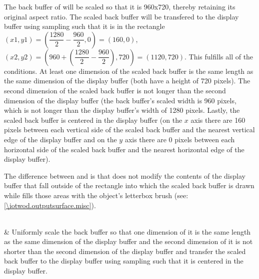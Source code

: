 \begin{libreqtab2}
 \begin{example}
 The back buffer of  will be scaled so that it is 960x720, thereby retaining its original aspect ratio. The scaled back buffer will be transfered to the display buffer using sampling such that it is in the rectangle $(x1,y1) = (\dfrac{1280}{2} - \dfrac{960}{2},0) = (160,0)$, $(x2,y2) = (960 + (\dfrac{1280}{2} - \dfrac{960}{2}),720) = (1120,720)$. This fulfills all of the conditions. At least one dimension of the scaled back buffer is the same length as the same dimension of the display buffer (both have a height of 720 pixels). The second dimension of the scaled back buffer is not longer than the second dimension of the display buffer (the back buffer's scaled width is 960 pixels, which is not longer than the display buffer's width of 1280 pixels. Lastly, the scaled back buffer is centered in the display buffer (on the $x$ axis there are 160 pixels between each vertical side of the scaled back buffer and the nearest vertical edge of the display buffer and on the $y$ axis there are 0 pixels between each horizontal side of the scaled back buffer and the nearest horizontal edge of the display buffer).
 \end{example}
 \begin{note}
 The difference between  and  is that  does not modify the contents of the display buffer that fall outside of the rectangle into which the scaled back buffer is drawn while  fills those areas with the  object's letterbox brush (see: \ref{\iotwod.outputsurface.misc}).
 \end{note}
 \\
 & Uniformly scale the back buffer so that one dimension of it is the same length as the same dimension of the display buffer and the second dimension of it is not shorter than the second dimension of the display buffer and transfer the scaled back buffer to the display buffer using sampling such that it is centered in the display buffer.
 

\end{libreqtab2}
